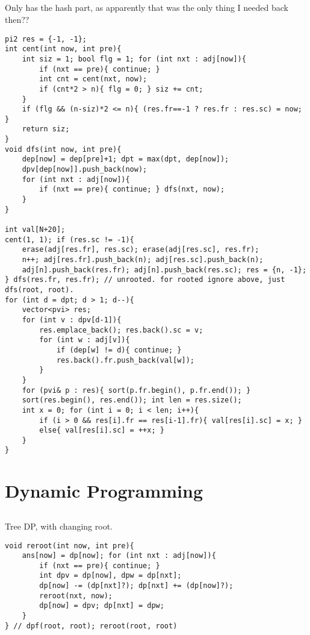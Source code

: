 \documentclass[landscape, 8pt, a4paper, oneside, twocolumn]{extarticle}
\begin{document}
\subsection{}
Only has the hash part, as apparently that was the only thing I needed back then??
\begin{verbatim}
pi2 res = {-1, -1};
int cent(int now, int pre){
    int siz = 1; bool flg = 1; for (int nxt : adj[now]){
        if (nxt == pre){ continue; }
        int cnt = cent(nxt, now);
        if (cnt*2 > n){ flg = 0; } siz += cnt;
    }
    if (flg && (n-siz)*2 <= n){ (res.fr==-1 ? res.fr : res.sc) = now; }
    return siz;
}
void dfs(int now, int pre){
    dep[now] = dep[pre]+1; dpt = max(dpt, dep[now]);
    dpv[dep[now]].push_back(now);
    for (int nxt : adj[now]){
        if (nxt == pre){ continue; } dfs(nxt, now);
    }
}

int val[N+20];
cent(1, 1); if (res.sc != -1){
    erase(adj[res.fr], res.sc); erase(adj[res.sc], res.fr);
    n++; adj[res.fr].push_back(n); adj[res.sc].push_back(n);
    adj[n].push_back(res.fr); adj[n].push_back(res.sc); res = {n, -1};
} dfs(res.fr, res.fr); // unrooted. for rooted ignore above, just dfs(root, root).
for (int d = dpt; d > 1; d--){
    vector<pvi> res;
    for (int v : dpv[d-1]){
        res.emplace_back(); res.back().sc = v;
        for (int w : adj[v]){
            if (dep[w] != d){ continue; }
            res.back().fr.push_back(val[w]);
        }
    }
    for (pvi& p : res){ sort(p.fr.begin(), p.fr.end()); }
    sort(res.begin(), res.end()); int len = res.size();
    int x = 0; for (int i = 0; i < len; i++){
        if (i > 0 && res[i].fr == res[i-1].fr){ val[res[i].sc] = x; }
        else{ val[res[i].sc] = ++x; }
    }
}
\end{verbatim}
\section{Dynamic Programming}
\subsection{}
Tree DP, with changing root.

\begin{verbatim}
void reroot(int now, int pre){
    ans[now] = dp[now]; for (int nxt : adj[now]){
        if (nxt == pre){ continue; }
        int dpv = dp[now], dpw = dp[nxt];
        dp[now] -= (dp[nxt]?); dp[nxt] += (dp[now]?);
        reroot(nxt, now);
        dp[now] = dpv; dp[nxt] = dpw;
    }
} // dpf(root, root); reroot(root, root)
\end{verbatim}
\end{document}
